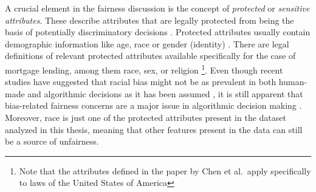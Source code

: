 %
%

A crucial element in the fairness discussion is the concept of \textit{protected} or \textit{sensitive attributes}. These describe attributes that are legally protected from being the basis of potentially discriminatory decisions \parencite{Datta2017}.
Protected attributes usually contain demographic information like age, race or gender (identity) \parencite{Teodorescu2020}. There are legal definitions of relevant protected attributes available specifically for the case of mortgage lending, among them race, sex, or religion \parencite{Chen2019}\footnote{Note that the attributes defined in the paper by Chen et al.\ apply specifically to laws of the United States of America}. 
Even though recent studies have suggested that racial bias might not be as prevalent in both human-made and algorithmic decisions as it has been assumed \parencite{Bhutta2022}, 
it is still apparent that bias-related fairness concerns are a major issue in algorithmic decision making \parencite{Mehrabi2021}.
Moreover, race is just one of the protected attributes present in the dataset analyzed in this thesis, meaning that other features present in the data can still be a source of unfairness.

